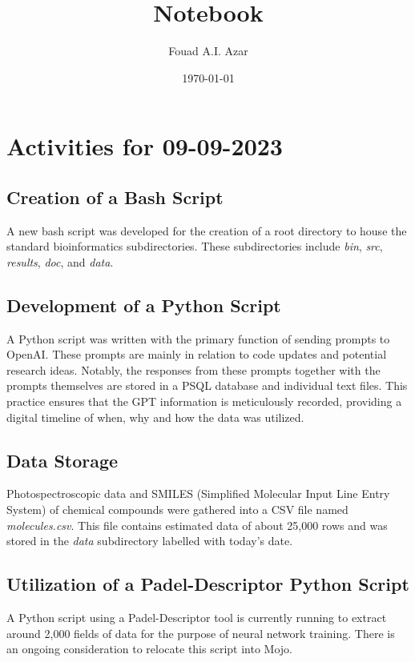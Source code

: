 \documentclass{article}
\title{Notebook}
\author{Fouad A.I. Azar}
\date{\today}
\begin{document}
\maketitle

\section{Activities for 09-09-2023}
\subsection{Creation of a Bash Script}
A new bash script was developed for the creation of a root directory to house the standard bioinformatics subdirectories. These subdirectories include \textit{bin}, \textit{src}, \textit{results}, \textit{doc}, and \textit{data}.

\subsection{Development of a Python Script}
A Python script was written with the primary function of sending prompts to OpenAI. These prompts are mainly in relation to code updates and potential research ideas. Notably, the responses from these prompts together with the prompts themselves are stored in a PSQL database and individual text files. This practice ensures that the GPT information is meticulously recorded, providing a digital timeline of when, why and how the data was utilized.

\subsection{Data Storage}
Photospectroscopic data and SMILES (Simplified Molecular Input Line Entry System) of chemical compounds were gathered into a CSV file named \textit{molecules.csv}. This file contains estimated data of about 25,000 rows and was stored in the \textit{data} subdirectory labelled with today's date.

\subsection{Utilization of a Padel-Descriptor Python Script}
A Python script using a Padel-Descriptor tool is currently running to extract around 2,000 fields of data for the purpose of neural network training. There is an ongoing consideration to relocate this script into Mojo.
\end{document}
